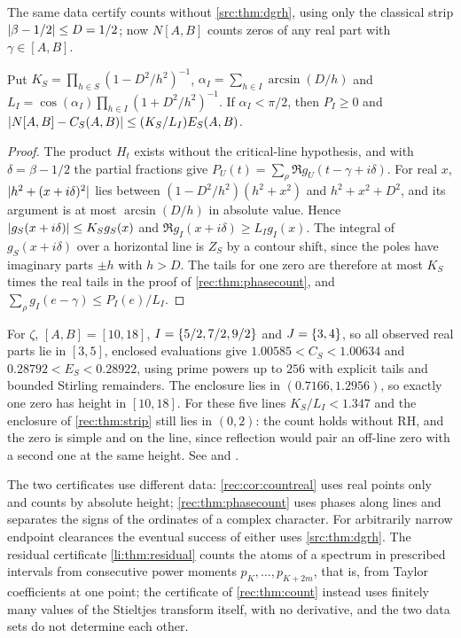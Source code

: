 The same data certify counts without \cref{src:thm:dgrh}, using only the classical strip
$\lvert\beta-1/2\rvert\le D=1/2$; now $N[A,B]$ counts zeros of any real part with $\gamma\in[A,B]$.

\begin{theorem}\label{rec:thm:strip}
Put $K_S=\prod_{h\in S}(1-D^2/h^2)^{-1}$, $\alpha_I=\sum_{h\in I}\arcsin(D/h)$ and
$L_I=\cos(\alpha_I)\prod_{h\in I}(1+D^2/h^2)^{-1}$. If $\alpha_I<\pi/2$, then $P_I\ge0$ and
$\lvert N[A,B]-C_S(A,B)\rvert\le(K_S/L_I)E_S(A,B)$.
\end{theorem}

\begin{proof}
The product $H_t$ exists without the critical-line hypothesis, and with $\delta=\beta-1/2$ the
partial fractions give $P_U(t)=\sum_\rho\Re g_U(t-\gamma+i\delta)$. For real $x$,
$\lvert h^2+(x+i\delta)^2\rvert$ lies between $(1-D^2/h^2)(h^2+x^2)$ and $h^2+x^2+D^2$, and its argument is
at most $\arcsin(D/h)$ in absolute value. Hence $\lvert g_S(x+i\delta)\rvert\le K_Sg_S(x)$ and
$\Re g_I(x+i\delta)\ge L_Ig_I(x)$. The integral of $g_S(x+i\delta)$ over a horizontal line is $Z_S$
by a contour shift, since the poles have imaginary parts $\pm h$ with $h>D$. The tails for one
zero are therefore at most $K_S$ times the real tails in the proof of \cref{rec:thm:phasecount},
and $\sum_\rho g_I(e-\gamma)\le P_I(e)/L_I$.
\end{proof}

\begin{example}\label{rec:ex:phase1018}
For $\zeta$, $[A,B]=[10,18]$, $I=\{5/2,7/2,9/2\}$ and $J=\{3,4\}$, so all observed real parts
lie in $[3,5]$, enclosed evaluations give $1.00585<C_S<1.00634$ and $0.28792<E_S<0.28922$, using
prime powers up to $256$ with explicit tails and bounded Stirling remainders. The enclosure lies
in $(0.7166,1.2956)$, so exactly one zero has height in $[10,18]$. For these five lines
$K_S/L_I<1.347$ and the enclosure of \cref{rec:thm:strip} still lies in $(0,2)$: the count holds
without RH, and the zero is simple and on the line, since reflection would pair an off-line zero
with a second one at the same height. See 
and .
\end{example}

The two certificates use different data: \cref{rec:cor:countreal} uses real points only and
counts by absolute height; \cref{rec:thm:phasecount} uses phases along lines and separates the
signs of the ordinates of a complex character. For arbitrarily narrow endpoint clearances the
eventual success of either uses \cref{src:thm:dgrh}. The residual certificate
\cref{li:thm:residual} counts the atoms of a spectrum in prescribed intervals from consecutive
power moments $p_K,\dots,p_{K+2m}$, that is, from Taylor coefficients at one point; the
certificate of \cref{rec:thm:count} instead uses finitely many values of the Stieltjes transform
itself, with no derivative, and the two data sets do not determine each other.

